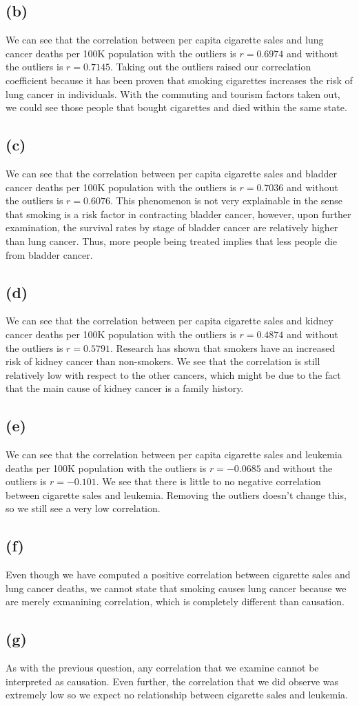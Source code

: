 \documentclass[11pt]{article}
\begin{document}
\subsection*{(b)}
We can see that the correlation between per capita cigarette sales and lung cancer deaths per 100K population with the outliers is $r=0.6974$ and without the outliers is $r=0.7145$. Taking out the outliers raised our correclation coefficient because it has been proven that smoking cigarettes increases the risk of lung cancer in individuals. With the commuting and tourism factors taken out, we could see those people that bought cigarettes and died within the same state.
\subsection*{(c)}
We can see that the correlation between per capita cigarette sales and bladder cancer deaths per 100K population with the outliers is $r=0.7036$ and without the outliers is $r=0.6076$. This phenomenon is not very explainable in the sense that smoking is a risk factor in contracting bladder cancer, however, upon further examination, the survival rates by stage of bladder cancer are relatively higher than lung cancer. Thus, more people being treated implies that less people die from bladder cancer.
\subsection*{(d)}
We can see that the correlation between per capita cigarette sales and kidney cancer deaths per 100K population with the outliers is $r=0.4874$ and without the outliers is $r=0.5791$. Research has shown that smokers have an increased risk of kidney cancer than non-smokers. We see that the correlation is still relatively low with respect to the other cancers, which might be due to the fact that the main cause of kidney cancer is a family history.
\subsection*{(e)}
We can see that the correlation between per capita cigarette sales and leukemia deaths per 100K population with the outliers is $r=-0.0685$ and without the outliers is $r=-0.101$. We see that there is little to no negative correlation between cigarette sales and leukemia. Removing the outliers doesn't change this, so we still see a very low correlation.
\subsection*{(f)}
Even though we have computed a positive correlation between cigarette sales and lung cancer deaths, we cannot state that smoking causes lung cancer because we are merely exmanining correlation, which is completely different than causation.
\subsection*{(g)}
As with the previous question, any correlation that we examine cannot be interpreted as causation. Even further, the correlation that we did observe was extremely low so we expect no relationship between cigarette sales and leukemia.
\end{document}
